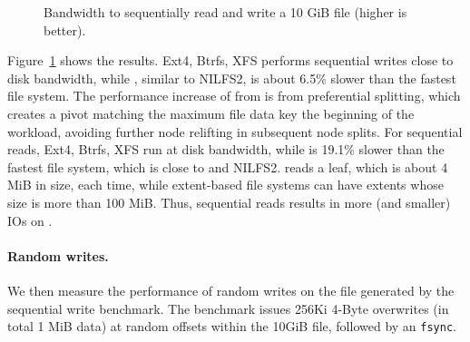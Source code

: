 \begin{figure}[t]
    \caption[Sequential-write and sequential-read benchmark]{\label{fig:seq_io}
        Bandwidth to sequentially read and write a 10 GiB file (higher is better).}
\end{figure}

Figure~\ref{fig:seq_io} shows the results.
Ext4, Btrfs, XFS performs sequential
writes close to disk bandwidth, while \betrfsFive, similar to NILFS2, is about
6.5\% slower than the fastest file system.
The performance increase of \betrfsFive from \betrfsFour is from preferential
splitting, which creates a pivot matching the maximum file data key the
beginning of the workload, avoiding further node relifting in subsequent node
splits.
For sequential reads, Ext4, Btrfs, XFS run at disk bandwidth, while \betrfsFive
is 19.1\% slower than the fastest file system, which is close to \betrfsFour
and NILFS2.
\betrfs reads a leaf, which is about 4 MiB in size, each time, while
extent-based file systems can have extents whose size is more than 100 MiB.
Thus, sequential reads results in more (and smaller) IOs on \betrfs.

\paragraph{Random writes.}

We then measure the performance of random writes on the file generated by the
sequential write benchmark.
The benchmark issues 256Ki 4-Byte overwrites (in total 1 MiB data) at random
offsets within the 10GiB file, followed by an \texttt{fsync}.

